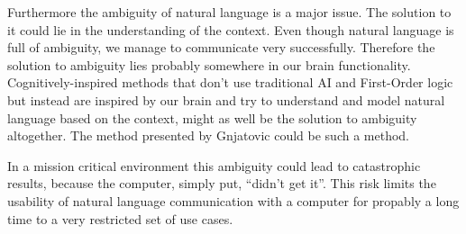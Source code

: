 \documentclass[12pt,twoside]{scrartcl}
\theoremstyle{plain}
\theoremstyle{definition}
\theoremstyle{remark}
\begin{document}
	Furthermore the ambiguity of natural language is a major issue. The solution to it could lie in the understanding of the context. Even though natural language is full of ambiguity, we manage to communicate very successfully. Therefore the solution to ambiguity lies probably somewhere in our brain functionality. Cognitively-inspired methods that don't use traditional AI and First-Order logic but instead are inspired by our brain and try to understand and model natural language based on the context, might as well be the solution to ambiguity altogether. The method presented by Gnjatovic\cite{Gnjatovic2012} could be such a method.
	
	In a mission critical environment this ambiguity could lead to catastrophic results, because the computer, simply put, ``didn't get it''. This risk limits the usability of natural language communication with a computer for propably a long time to a very restricted set of use cases.
	
%
%
\clearpage


\end{document}
